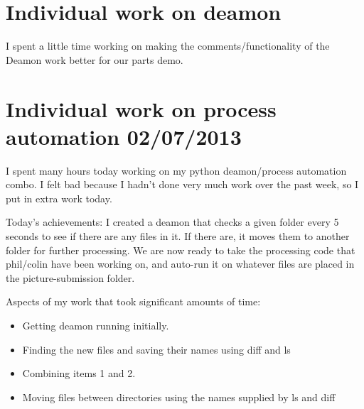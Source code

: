 \documentclass[]{article}
\begin{document}
	\section{Individual work on deamon}
	
	I spent a little time working on making the comments/functionality of the Deamon work better for our parts demo. 
	
	\section{Individual work on process automation 02/07/2013}
	
	I spent many hours today working on my python deamon/process automation combo. I felt bad because I hadn't done very much work over the past week, so I put in extra work today.
	
	Today's achievements: I created a deamon that checks a given folder every 5 seconds to see if there are any files in it. If there are, it moves them to another folder for further processing. We are now ready to take the processing code that phil/colin have been working on, and auto-run it on whatever files are placed in the picture-submission folder.
	
	Aspects of my work that took significant amounts of time:
	
	\begin{itemize}
					\item Getting deamon running initially.
					\item Finding the new files and saving their names using diff and ls
					\item Combining items 1 and 2.
					\item Moving files between directories using the names supplied by ls and diff
	\end{itemize}
		
\end{document}

